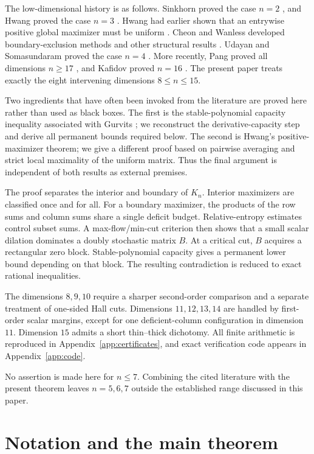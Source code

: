 \documentclass[11pt]{article}
\theoremstyle{definition}
\newcommand{\1}{\mathbf{1}}
\begin{document}
The low-dimensional history is as follows.  Sinkhorn proved the case $n=2$ \cite{Sinkhorn1984}, and Hwang proved the case $n=3$ \cite{Hwang1987}.  Hwang had earlier shown that an entrywise positive global maximizer must be uniform \cite{Hwang1986}.  Cheon and Wanless developed boundary-exclusion methods and other structural results \cite{CheonWanless2012}.  Udayan and Somasundaram proved the case $n=4$ \cite{UdayanSomasundaram2024}.  More recently, Pang proved all dimensions $n\ge 17$ \cite{Pang2026}, and Kafidov proved $n=16$ \cite{Kafidov2026}.  The present paper treats exactly the eight intervening dimensions $8\le n\le 15$.

Two ingredients that have often been invoked from the literature are proved here rather than used as black boxes.  The first is the stable-polynomial capacity inequality associated with Gurvits \cite{Gurvits2008}; we reconstruct the derivative-capacity step and derive all permanent bounds required below.  The second is Hwang's positive-maximizer theorem; we give a different proof based on pairwise averaging and strict local maximality of the uniform matrix.  Thus the final argument is independent of both results as external premises.

The proof separates the interior and boundary of $K_n$.  Interior maximizers are classified once and for all.  For a boundary maximizer, the products of the row sums and column sums share a single deficit budget.  Relative-entropy estimates control subset sums.  A max-flow/min-cut criterion then shows that a small scalar dilation dominates a doubly stochastic matrix $B$.  At a critical cut, $B$ acquires a rectangular zero block.  Stable-polynomial capacity gives a permanent lower bound depending on that block.  The resulting contradiction is reduced to exact rational inequalities.

The dimensions $8,9,10$ require a sharper second-order comparison and a separate treatment of one-sided Hall cuts.  Dimensions $11,12,13,14$ are handled by first-order scalar margins, except for one deficient-column configuration in dimension $11$.  Dimension $15$ admits a short thin--thick dichotomy.  All finite arithmetic is reproduced in Appendix~\ref{app:certificates}, and exact verification code appears in Appendix~\ref{app:code}.

No assertion is made here for $n\le 7$.  Combining the cited literature with the present theorem leaves $n=5,6,7$ outside the established range discussed in this paper.

\section{Notation and the main theorem}
\end{document}
